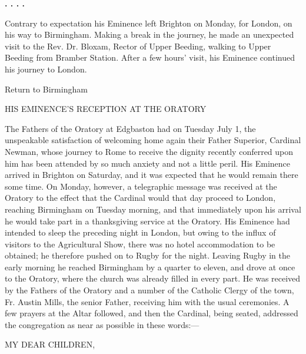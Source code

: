 \textbf{. .
. .}

Contrary to expectation his Eminence left Brighton on Monday, for
London, on his way to Birmingham. Making a break in the journey, he
made an unexpected visit to the Rev. Dr. Bloxam, Rector of Upper
Beeding, walking to Upper Beeding from Bramber Station. After a few
hours' visit, his Eminence continued his journey to London.

Return to Birmingham

HIS EMINENCE'S
RECEPTION AT
THE ORATORY

The Fathers of the Oratory at Edgbaston had on Tuesday July 1, the
unspeakable satisfaction of welcoming home again their Father
Superior, Cardinal Newman, whose journey to Rome to receive the
dignity recently conferred upon him has been attended by so much
anxiety and not a little peril. His Eminence arrived in Brighton on
Saturday, and it was expected that he would remain there some time. On
Monday, however, a telegraphic message was received at the Oratory to
the effect that the Cardinal would that day proceed to London,
reaching Birmingham on Tuesday morning, and that immediately upon his
arrival he would take part in a thanksgiving service at the Oratory.
His Eminence had intended to sleep the preceding
night in London, but owing to the influx of visitors to the
Agricultural Show, there was no hotel accommodation to be obtained; he
therefore pushed on to Rugby for the night. Leaving Rugby in the early
morning he reached Birmingham by a quarter to eleven, and drove at
once to the Oratory, where the church was already filled in every
part. He was received by the Fathers of the Oratory and a number of
the Catholic Clergy of the town, Fr. Austin Mills, the senior Father,
receiving him with the usual ceremonies. A few prayers at the Altar
followed, and then the Cardinal, being seated, addressed the
congregation as near as possible in these words:—

MY DEAR CHILDREN,

